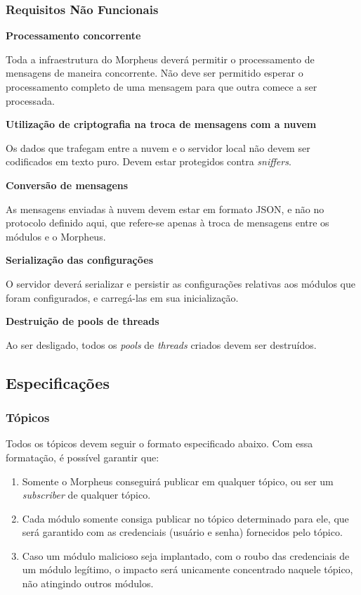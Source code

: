 \subsubsection{Requisitos Não Funcionais}
\begin{description}
\item \textbf{Processamento concorrente}

Toda a infraestrutura do Morpheus deverá permitir o processamento de mensagens de maneira concorrente. Não deve ser permitido esperar o processamento completo de uma mensagem para que outra comece a ser processada.

\item \textbf{Utilização de criptografia na troca de mensagens com a nuvem}

Os dados que trafegam entre a nuvem e o servidor local não devem ser codificados em texto puro. Devem estar protegidos contra \textit{sniffers}.

\item \textbf{Conversão de mensagens}

As mensagens enviadas à nuvem devem estar em formato JSON, e não no protocolo definido aqui, que refere-se apenas à troca de mensagens entre os módulos e o Morpheus.

\item \textbf{Serialização das configurações}

O servidor deverá serializar e persistir as configurações relativas aos módulos que foram configurados, e carregá-las em sua inicialização.

\item \textbf{Destruição de pools de threads}

Ao ser desligado, todos os \textit{pools} de \textit{threads} criados devem ser destruídos.

\end{description}

\subsection{Especificações}

\subsubsection{Tópicos}
Todos os tópicos devem seguir o formato especificado abaixo. Com essa formatação, é possível garantir que:

\begin{enumerate}
\item Somente o Morpheus conseguirá publicar em qualquer tópico, ou ser um \textit{subscriber} de qualquer tópico.
\item Cada módulo somente consiga publicar no tópico determinado para ele, que será garantido com as credenciais (usuário e senha) fornecidos pelo tópico.
\item Caso um módulo malicioso seja implantado, com o roubo das credenciais de um módulo legítimo, o impacto será unicamente concentrado naquele tópico, não atingindo outros módulos.
\end{enumerate}


